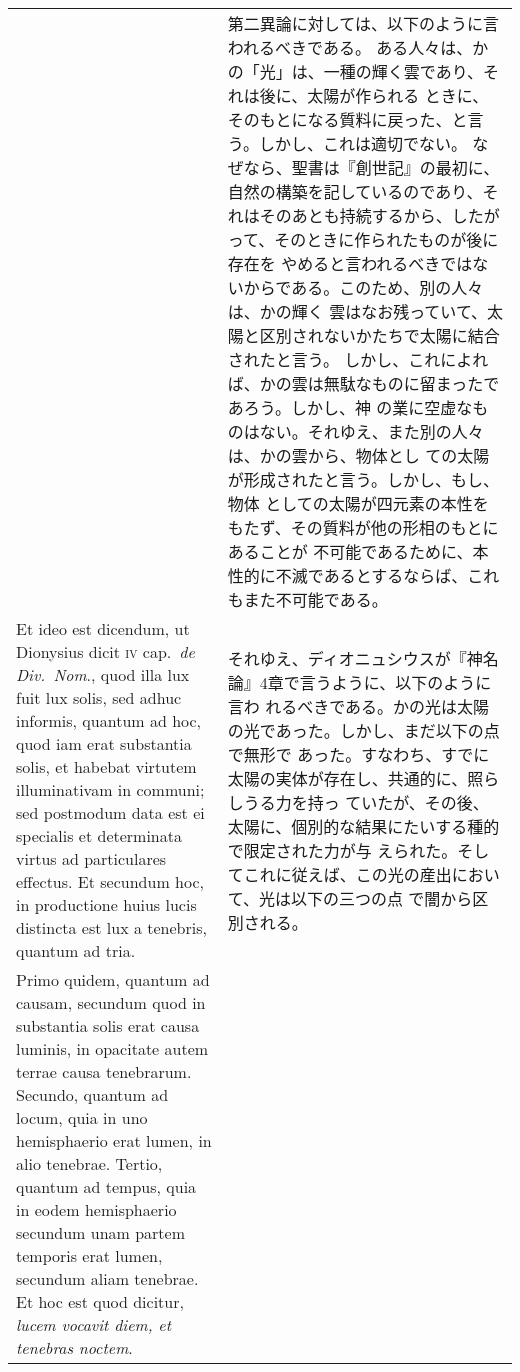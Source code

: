 \documentclass[10pt]{jsarticle} %
\begin{document}
\begin{longtable}{p{21em}p{21em}}
&


第二異論に対しては、以下のように言われるべきである。
ある人々は、かの「光」は、一種の輝く雲であり、それは後に、太陽が作られる
 ときに、そのもとになる質料に戻った、と言う。しかし、これは適切でない。
 なぜなら、聖書は『創世記』の最初に、自然の構築を記しているのであり、そ
 れはそのあとも持続するから、したがって、そのときに作られたものが後に存在を
 やめると言われるべきではないからである。このため、別の人々は、かの輝く
 雲はなお残っていて、太陽と区別されないかたちで太陽に結合されたと言う。
 しかし、これによれば、かの雲は無駄なものに留まったであろう。しかし、神
 の業に空虚なものはない。それゆえ、また別の人々は、かの雲から、物体とし
 ての太陽が形成されたと言う。しかし、もし、物体
 としての太陽が四元素の本性をもたず、その質料が他の形相のもとにあることが
 不可能であるために、本性的に不滅であるとするならば、これもまた不可能である。

\\



Et ideo est dicendum, ut Dionysius dicit {\scshape iv} cap.~{\itshape de
Div.~Nom}., quod illa lux fuit lux solis, sed adhuc informis, quantum ad
hoc, quod iam erat substantia solis, et habebat virtutem illuminativam
in communi; sed postmodum data est ei specialis et determinata virtus ad
particulares effectus. Et secundum hoc, in productione huius lucis
distincta est lux a tenebris, quantum ad tria. 



&

それゆえ、ディオニュシウスが『神名論』4章で言うように、以下のように言わ
 れるべきである。かの光は太陽の光であった。しかし、まだ以下の点で無形で
 あった。すなわち、すでに太陽の実体が存在し、共通的に、照らしうる力を持っ
 ていたが、その後、太陽に、個別的な結果にたいする種的で限定された力が与
 えられた。そしてこれに従えば、この光の産出において、光は以下の三つの点
 で闇から区別される。


\\



Primo quidem, quantum ad
causam, secundum quod in substantia solis erat causa luminis, in
opacitate autem terrae causa tenebrarum. Secundo, quantum ad locum, quia
in uno hemisphaerio erat lumen, in alio tenebrae. Tertio, quantum ad
tempus, quia in eodem hemisphaerio secundum unam partem temporis erat
lumen, secundum aliam tenebrae. Et hoc est quod dicitur, {\itshape lucem vocavit
diem, et tenebras noctem}.


&


\end{longtable}
\end{document}
